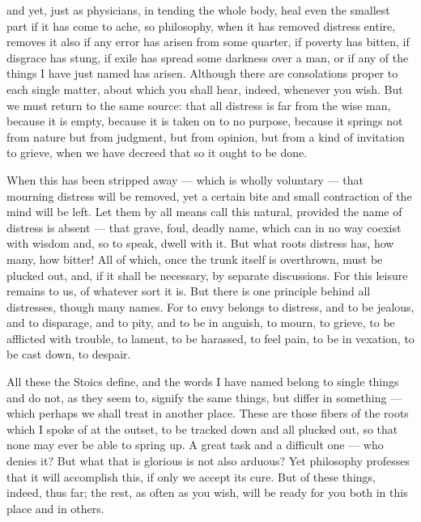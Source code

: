  and yet, just as physicians, in tending the whole body, heal even the smallest part if it has come to ache, so philosophy, when it has removed distress entire, removes it also if any error has arisen from some quarter, if poverty has bitten, if disgrace has stung, if exile has spread some darkness over a man, or if any of the things I have just named has arisen. Although there are consolations proper to each single matter, about which you shall hear, indeed, whenever you wish. But we must return to the same source: that all distress is far from the wise man, because it is empty, because it is taken on to no purpose, because it springs not from nature but from judgment, but from opinion, but from a kind of invitation to grieve, when we have decreed that so it ought to be done.

 When this has been stripped away — which is wholly voluntary — that mourning distress will be removed, yet a certain bite and small contraction of the mind will be left. Let them by all means call this natural, provided the name of distress is absent — that grave, foul, deadly name, which can in no way coexist with wisdom and, so to speak, dwell with it. But what roots distress has, how many, how bitter! All of which, once the trunk itself is overthrown, must be plucked out, and, if it shall be necessary, by separate discussions. For this leisure remains to us, of whatever sort it is. But there is one principle behind all distresses, though many names. For to envy belongs to distress, and to be jealous, and to disparage, and to pity, and to be in anguish, to mourn, to grieve, to be afflicted with trouble, to lament, to be harassed, to feel pain, to be in vexation, to be cast down, to despair.

 All these the Stoics define, and the words I have named belong to single things and do not, as they seem to, signify the same things, but differ in something — which perhaps we shall treat in another place. These are those fibers of the roots which I spoke of at the outset, to be tracked down and all plucked out, so that none may ever be able to spring up. A great task and a difficult one — who denies it? But what that is glorious is not also arduous? Yet philosophy professes that it will accomplish this, if only we accept its cure. But of these things, indeed, thus far; the rest, as often as you wish, will be ready for you both in this place and in others.


